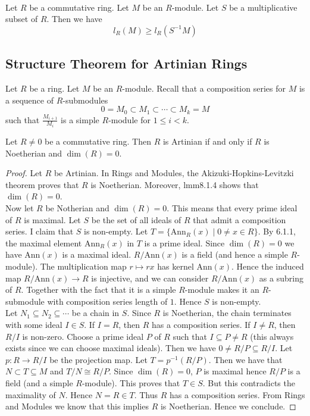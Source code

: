 \documentclass[a4paper]{article}
\begin{document}
\begin{lmm}{}{}\\
Let $R$ be a commutative ring. Let $M$ be an $R$-module. Let $S$ be a multiplicative subset of $R$. Then we have $$l_R(M)\geq l_R(S^{-1}M)$$
\end{lmm}

\subsection{Structure Theorem for Artinian Rings}
Let $R$ be a ring. Let $M$ be an $R$-module. Recall that a composition series for $M$ is a sequence of $R$-submodules $$0=M_0\subset M_1\subset\cdots\subset M_k=M$$ such that $\frac{M_{i+1}}{M_i}$ is a simple $R$-module for $1\leq i<k$. 

\begin{prp}{}{} Let $R\neq 0$ be a commutative ring. Then $R$ is Artinian if and only if $R$ is Noetherian and $\dim(R)=0$. 
\begin{proof}
Let $R$ be Artinian. In Rings and Modules, the Akizuki-Hopkins-Levitzki theorem proves that $R$ is Noetherian. Moreover, lmm8.1.4 shows that $\dim(R)=0$. \\

Now let $R$ be Notherian and $\dim(R)=0$. This means that every prime ideal of $R$ is maximal. Let $S$ be the set of all ideals of $R$ that admit a composition series. I claim that $S$ is non-empty. Let $T=\{\text{Ann}_R(x)\;|\;0\neq x\in R\}$. By 6.1.1, the maximal element $\text{Ann}_R(x)$ in $T$ is a prime ideal. Since $\dim(R)=0$ we have $\text{Ann}(x)$ is a maximal ideal. $R/\text{Ann}(x)$ is a field (and hence a simple $R$-module). The multiplication map $r\mapsto rx$ has kernel $\text{Ann}(x)$. Hence the induced map $R/\text{Ann}(x)\to R$ is injective, and we can consider $R/\text{Ann}(x)$ as a subring of $R$. Together with the fact that it is a simple $R$-module makes it an $R$-submodule with composition series length of $1$. Hence $S$ is non-empty. \\

Let $N_1\subseteq N_2\subseteq\cdots$ be a chain in $S$. Since $R$ is Noetherian, the chain terminates with some ideal $I\in S$. If $I=R$, then $R$ has a composition series. If $I\neq R$, then $R/I$ is non-zero. Choose a prime ideal $P$ of $R$ such that $I\subseteq P\neq R$ (this always exists since we can choose maximal ideals). Then we have $0\neq R/P\subseteq R/I$. Let $p:R\to R/I$ be the projection map. Let $T=p^{-1}(R/P)$. Then we have that $N\subset T\subseteq M$ and $T/N\cong R/P$. Since $\dim(R)=0$, $P$ is maximal hence $R/P$ is a field (and a simple $R$-module). This proves that $T\in S$. But this contradicts the maximality of $N$. Hence $N=R\in T$. Thus $R$ has a composition series. From Rings and Modules we know that this implies $R$ is Noetherian. Hence we conclude. 
\end{proof}
\end{prp}
\end{document}
